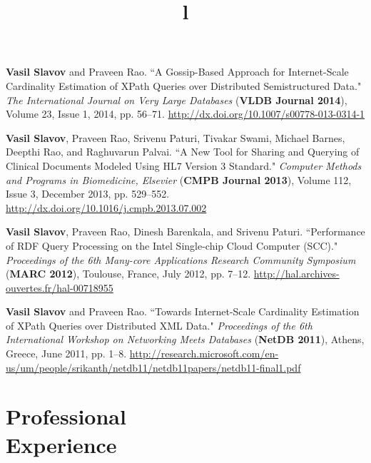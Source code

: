 \documentclass[margin,line]{resume}
\begin{document}
\begin{resume}
\vspace{-2mm}
    \textbf{Vasil Slavov} and Praveen Rao.
    ``A Gossip-Based Approach for Internet-Scale Cardinality Estimation of XPath Queries over Distributed Semistructured Data."
    \textsl{The International Journal on Very Large Databases} (\textbf{VLDB Journal 2014}), Volume 23, Issue 1, 2014, pp. 56--71. \url{http://dx.doi.org/10.1007/s00778-013-0314-1}
    
\vspace{-2mm}
    \textbf{Vasil Slavov}, Praveen Rao, Srivenu Paturi, Tivakar Swami, Michael Barnes, Deepthi Rao, and Raghuvarun Palvai.
    ``A New Tool for Sharing and Querying of Clinical Documents Modeled Using HL7 Version 3 Standard."
   \textsl{Computer Methods and Programs in Biomedicine, Elsevier} (\textbf{CMPB Journal 2013}), Volume 112, Issue 3, December 2013, pp. 529--552. \url{http://dx.doi.org/10.1016/j.cmpb.2013.07.002}

\vspace{-2mm}
    \textbf{Vasil Slavov}, Praveen Rao, Dinesh Barenkala, and Srivenu Paturi.
    ``Performance of RDF Query Processing on the Intel Single-chip Cloud Computer (SCC)."
    \textsl{Proceedings of the 6th Many-core Applications Research Community Symposium} (\textbf{MARC 2012}), Toulouse, France, July 2012, pp. 7--12. \url{http://hal.archives-ouvertes.fr/hal-00718955}
    
\vspace{-2mm}
    \textbf{Vasil Slavov} and Praveen Rao.
    ``Towards Internet-Scale Cardinality Estimation of XPath Queries over Distributed XML Data."
    \textsl{Proceedings of the 6th International Workshop on Networking Meets Databases} (\textbf{NetDB 2011}), Athens, Greece, June 2011, pp. 1--8. \url{http://research.microsoft.com/en-us/um/people/srikanth/netdb11/netdb11papers/netdb11-final1.pdf}


\newpage        
    \section{\mysidestyle Professional\\Experience}
    
    \begin{format}
    \title{l}\\
    \\
    \end{format}


\end{resume}
\end{document}
